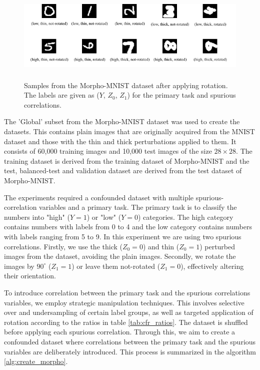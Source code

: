 \documentclass[12pt,DIV14,BCOR12mm,a4paper,footinclude=false,headinclude,parskip=half-,twoside,openright,cleardoublepage=empty,toc=index,bibliography=totoc,listof=totoc]{scrreprt}
\numberwithin{equation}{chapter}
\begin{document}
\begin{figure}[H]
    \centering
    \includegraphics[height=4.5cm]{thesis/figures/morpho-mnist.pdf} 
    \caption{Samples from the Morpho-MNIST dataset after applying rotation. The labels are given as ($Y$, $Z_0$, $Z_1$) for the primary task and spurious correlations.}
    \label{fig:morpho_mnist}
\end{figure}

The 'Global' subset from the Morpho-MNIST dataset was used to create the datasets. This contains plain images that are originally acquired from the MNIST dataset and those with the thin and thick perturbations applied to them. It consists of 60,000 training images and 10,000 test images of the size $28 \times 28$. The training dataset is derived from the training dataset of Morpho-MNIST and the test, balanced-test and validation dataset are derived from the test dataset of Morpho-MNIST.

The experiments required a confounded dataset with multiple spurious-correlation variables and a primary task. The primary task is to classify the numbers into "high" ($Y=1$) or "low" ($Y=0$) categories. The high category contains numbers with labels from 0 to 4 and the low category contains numbers with labels ranging from 5 to 9. In this experiment we are using two spurious correlations. Firstly, we use the thick ($Z_0 = 0$) and thin ($Z_0 = 1$) perturbed images from the dataset, avoiding the plain images. Secondly, we rotate the images by $90^\circ$ ($Z_1 = 1$) or leave them not-rotated ($Z_1=0$), effectively altering their orientation.

To introduce correlation between the primary task and the spurious correlations variables, we employ strategic manipulation techniques. This involves selective over and undersampling of certain label groups, as well as targeted application of rotation according to the ratios in table \ref{tab:cfr_ratios}. The dataset is shuffled before applying each spurious correlation.  Through this, we aim to create a confounded dataset where correlations between the primary task and the spurious variables are deliberately introduced. This process is summarized in the algorithm \ref{alg:create_morpho}.
\end{document}
